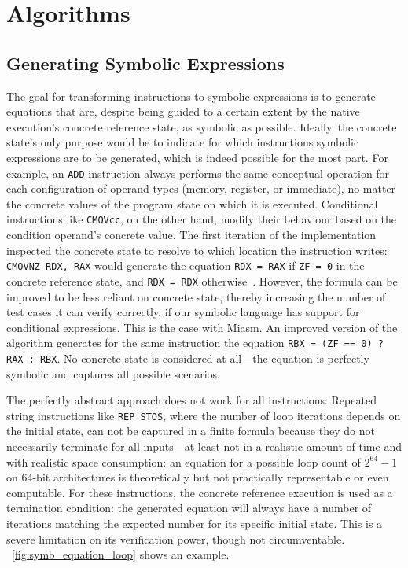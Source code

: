 \section{Algorithms}\label{sec:algorithms}

\subsection{Generating Symbolic Expressions}\label{sec:symb_expr_impl}

The goal for transforming instructions to symbolic expressions is to generate equations that are, despite being guided
to a certain extent by the native execution's concrete reference state, as symbolic as possible. Ideally, the concrete
state's only purpose would be to indicate for which instructions symbolic expressions are to be generated, which is
indeed possible for the most part. For example, an \texttt{ADD} instruction always performs the same conceptual
operation for each configuration of operand types (memory, register, or immediate), no matter the concrete values of the
program state on which it is executed. Conditional instructions like \texttt{CMOVcc}, on the other hand, modify their
behaviour based on the condition operand's concrete value. The first iteration of the implementation inspected the
concrete state to resolve to which location the instruction writes: \texttt{CMOVNZ RDX, RAX} would generate the equation
\texttt{RDX = RAX} if \texttt{ZF = 0} in the concrete reference state, and \texttt{RDX = RDX}
otherwise~\cite{Intel2023DeveloperManualVol1}.  However, the formula can be improved to be less reliant on concrete
state, thereby increasing the number of test cases it can verify correctly, if our symbolic language has support for
conditional expressions. This is the case with Miasm.  An improved version of the algorithm generates for the same
instruction the equation \texttt{RBX = (ZF == 0) ? RAX : RBX}. No concrete state is considered at all---the equation is
perfectly symbolic and captures all possible scenarios.

The perfectly abstract approach does not work for all instructions: Repeated string instructions like \texttt{REP STOS},
where the number of loop iterations depends on the initial state, can not be captured in a finite formula because they
do not necessarily terminate for all inputs---at least not in a realistic amount of time and with realistic space
consumption: an equation for a possible loop count of $2^{64} - 1$ on 64-bit architectures is theoretically but not
practically representable or even computable. For these instructions, the concrete reference execution is used as a
termination condition: the generated equation will always have a number of iterations matching the expected number for
its specific initial state. This is a severe limitation on its verification power, though not circumventable.
\lstlistingname~\ref{fig:symb_equation_loop} shows an example.

